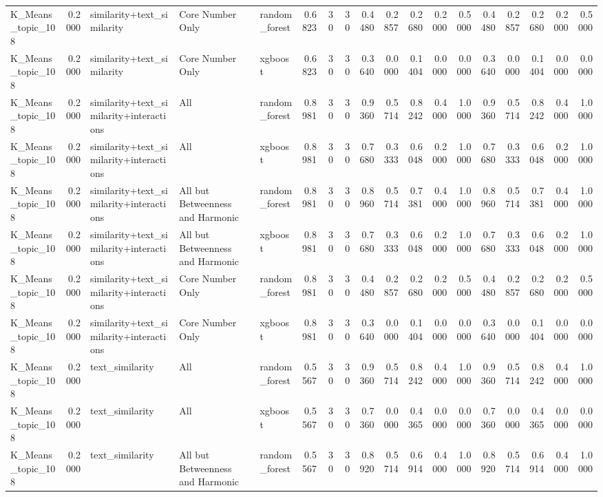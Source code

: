 \begin{tabular}{lrlllrrrrrrrrrrrrr}
K_Means_topic_108 & 0.2000 & similarity+text_similarity & Core Number Only & random_forest & 0.6823 & 30 & 30 & 0.4480 & 0.2857 & 0.2680 & 0.2000 & 0.5000 & 0.4480 & 0.2857 & 0.2680 & 0.2000 & 0.5000 \\
K_Means_topic_108 & 0.2000 & similarity+text_similarity & Core Number Only & xgboost & 0.6823 & 30 & 30 & 0.3640 & 0.0000 & 0.1404 & 0.0000 & 0.0000 & 0.3640 & 0.0000 & 0.1404 & 0.0000 & 0.0000 \\
K_Means_topic_108 & 0.2000 & similarity+text_similarity+interactions & All & random_forest & 0.8981 & 30 & 30 & 0.9360 & 0.5714 & 0.8242 & 0.4000 & 1.0000 & 0.9360 & 0.5714 & 0.8242 & 0.4000 & 1.0000 \\
K_Means_topic_108 & 0.2000 & similarity+text_similarity+interactions & All & xgboost & 0.8981 & 30 & 30 & 0.7680 & 0.3333 & 0.6048 & 0.2000 & 1.0000 & 0.7680 & 0.3333 & 0.6048 & 0.2000 & 1.0000 \\
K_Means_topic_108 & 0.2000 & similarity+text_similarity+interactions & All but Betweenness and Harmonic & random_forest & 0.8981 & 30 & 30 & 0.8960 & 0.5714 & 0.7381 & 0.4000 & 1.0000 & 0.8960 & 0.5714 & 0.7381 & 0.4000 & 1.0000 \\
K_Means_topic_108 & 0.2000 & similarity+text_similarity+interactions & All but Betweenness and Harmonic & xgboost & 0.8981 & 30 & 30 & 0.7680 & 0.3333 & 0.6048 & 0.2000 & 1.0000 & 0.7680 & 0.3333 & 0.6048 & 0.2000 & 1.0000 \\
K_Means_topic_108 & 0.2000 & similarity+text_similarity+interactions & Core Number Only & random_forest & 0.8981 & 30 & 30 & 0.4480 & 0.2857 & 0.2680 & 0.2000 & 0.5000 & 0.4480 & 0.2857 & 0.2680 & 0.2000 & 0.5000 \\
K_Means_topic_108 & 0.2000 & similarity+text_similarity+interactions & Core Number Only & xgboost & 0.8981 & 30 & 30 & 0.3640 & 0.0000 & 0.1404 & 0.0000 & 0.0000 & 0.3640 & 0.0000 & 0.1404 & 0.0000 & 0.0000 \\
K_Means_topic_108 & 0.2000 & text_similarity & All & random_forest & 0.5567 & 30 & 30 & 0.9360 & 0.5714 & 0.8242 & 0.4000 & 1.0000 & 0.9360 & 0.5714 & 0.8242 & 0.4000 & 1.0000 \\
K_Means_topic_108 & 0.2000 & text_similarity & All & xgboost & 0.5567 & 30 & 30 & 0.7360 & 0.0000 & 0.4365 & 0.0000 & 0.0000 & 0.7360 & 0.0000 & 0.4365 & 0.0000 & 0.0000 \\
K_Means_topic_108 & 0.2000 & text_similarity & All but Betweenness and Harmonic & random_forest & 0.5567 & 30 & 30 & 0.8920 & 0.5714 & 0.6914 & 0.4000 & 1.0000 & 0.8920 & 0.5714 & 0.6914 & 0.4000 & 1.0000 \\

\end{tabular}
